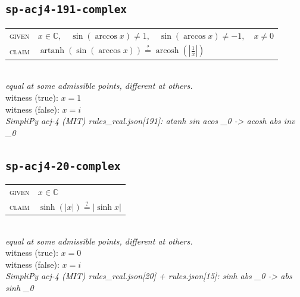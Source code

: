 \documentclass[11pt]{article}
\begin{document}
\subsection*{\texttt{sp-acj4-191-complex}}
\begin{tabular}{@{}l@{\quad}l@{}}
\textsc{given} & $x \in \mathbb{C},\quad \sin\left(\arccos x\right) \neq 1,\quad \sin\left(\arccos x\right) \neq -1,\quad x \neq 0$ \\[4pt]
\textsc{claim} & $\displaystyle \operatorname{artanh}\left(\sin\left(\arccos x\right)\right) \overset{?}{=} \operatorname{arcosh}\left(\left|\frac{1}{x}\right|\right)$ \\
\end{tabular}\\[2pt]
{\small\emph{equal at some admissible points, different at others.}}\\
{\footnotesize\color{gray}witness (true): $x = 1$}\\
{\footnotesize\color{gray}witness (false): $x = i$}\\
\emph{SimpliPy acj-4 (MIT) rules\_real.json[191]: atanh sin acos \_0  ->  acosh abs inv \_0}\\

\subsection*{\texttt{sp-acj4-20-complex}}
\begin{tabular}{@{}l@{\quad}l@{}}
\textsc{given} & $x \in \mathbb{C}$ \\[4pt]
\textsc{claim} & $\displaystyle \sinh\left(\left|x\right|\right) \overset{?}{=} \left|\sinh x\right|$ \\
\end{tabular}\\[2pt]
{\small\emph{equal at some admissible points, different at others.}}\\
{\footnotesize\color{gray}witness (true): $x = 0$}\\
{\footnotesize\color{gray}witness (false): $x = i$}\\
\emph{SimpliPy acj-4 (MIT) rules\_real.json[20] + rules.json[15]: sinh abs \_0  ->  abs sinh \_0}\\
\end{document}

